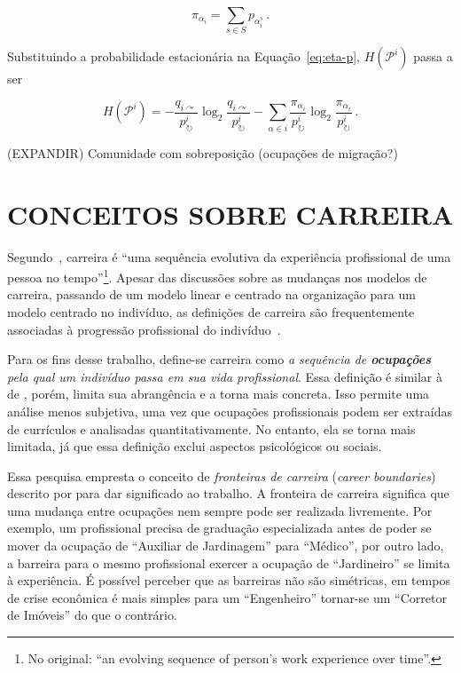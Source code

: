 \documentclass[12pt,a4paper]{article}
\begin{document}
\begin{equation*} \label{eq:page-rank-multilayer}
\pi_{\alpha_i} = \sum_{s \in S} p_{\alpha_i^s}\,.
\end{equation*}

Substituindo a probabilidade estacionária na Equação~\ref{eq:eta-p}, $H(\mathcal{P}^i)$ passa a ser

\begin{equation*}
H(\mathcal{P}^i) = - \frac{q_{i \curvearrowright}}{p^i_\circlearrowright} \log_2 \frac{q_{i \curvearrowright}}{p^i_\circlearrowright} 
-  \sum_{\alpha \in i} \frac{\pi_{\alpha_i}}{p^i_\circlearrowright} \log_2  \frac{\pi_{\alpha_i}}{p^i_\circlearrowright}\,.
\end{equation*}


(EXPANDIR) Comunidade com sobreposição (ocupações de migração?)

\section{CONCEITOS SOBRE CARREIRA}

Segundo~, carreira é \foreignquote{english}{uma sequência evolutiva da experiência profissional de uma pessoa no tempo}\footnote{No original: \enquote{an evolving sequence of person's work experience over time}.}. Apesar das discussões sobre as mudanças nos modelos de carreira, passando de um modelo linear e centrado na organização para um modelo centrado no indivíduo, as definições de carreira são frequentemente associadas à progressão profissional do indivíduo~\cite{Baruch2004-oy,Sullivan2009-xb,Bendassolli2009-bg}.

Para os fins desse trabalho, define-se carreira como \textit{a sequência de \textbf{ocupações} pela qual um indivíduo passa em sua vida profissional}. Essa definição é similar à de , porém, limita sua abrangência e a torna mais concreta. Isso permite uma análise menos subjetiva, uma vez que ocupações profissionais podem ser extraídas de currículos e analisadas quantitativamente. No entanto, ela se torna mais limitada, já que essa definição exclui aspectos psicológicos ou sociais.

Essa pesquisa empresta o conceito de \textit{fronteiras de carreira} (\textit{career boundaries}) descrito por  para dar significado ao trabalho. A fronteira de carreira significa que uma mudança entre ocupações nem sempre pode ser realizada livremente. Por exemplo, um profissional precisa de graduação especializada antes de poder se mover da ocupação de \enquote{Auxiliar de Jardinagem} para \enquote{Médico}, por outro lado, a barreira para o mesmo profissional exercer a ocupação de \enquote{Jardineiro} se limita à experiência. É possível perceber que as barreiras não são simétricas, em tempos de crise econômica é mais simples para um \enquote{Engenheiro} tornar-se um \enquote{Corretor de Imóveis} do que o contrário.
\end{document}

